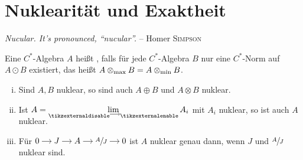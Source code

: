 \section{Nuklearität und Exaktheit} %
\label{sec:2}

\emph{\textenglish{Nucular. It's pronounced, \enquote{nucular}.}} -- Homer \textsc{Simpson}

\begin{definition}[{name=[{nukleare C*-Algebra}]}]
	Eine $C^*$-Algebra $A$ heißt , falls für jede $C^*$-Algebra $B$ nur eine $C^*$-Norm auf $A \odot B$ existiert, das heißt $A \mathbin{\otimes_{\max}} B = A \mathbin{\otimes_{\min}} B$. 
\end{definition}

\begin{proposition}[{name=[{Nuklearität und Summen, Tensorprodukte, direkte Limiten und Quotienten}]},label=prop:22]
	\leavevmode
	\begin{enumerate}[(i)]
		\item Sind $A,B$ nuklear, so sind auch $A \oplus B$ und $A \otimes B$ nuklear.
		\item Ist $A = \Dlim\, A_i$ mit $A_i$ nuklear, so ist auch $A$ nuklear.
		\item Für \(
			\begin{tikzcd}[cramped,sep=small]
				0 \rar & J \rar & A \rar & \sfrac{A}{J} \rar & 0 
			\end{tikzcd}
		\) ist $A$ nuklear genau dann, wenn $J$ und $\sfrac{A}{J}$ nuklear sind.
	\end{enumerate}
\end{proposition}
